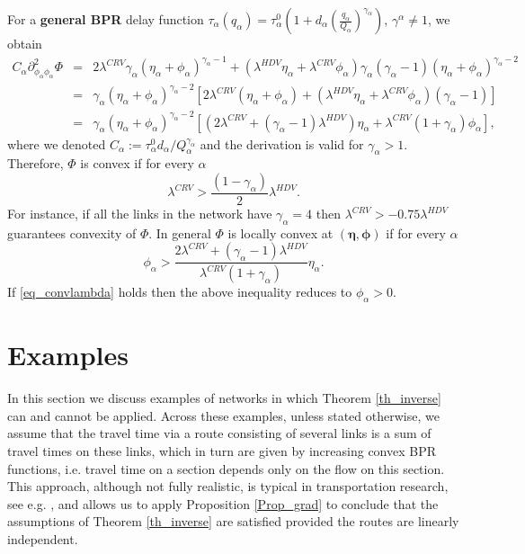 \documentclass[a4paper,11pt]{article}
\begin{document}
For a {\bf general BPR} delay function 
$\tau_\alpha (q_\alpha) = \tau^0_\alpha \left(1 + d_\alpha \left(\frac {q_\alpha}{Q_\alpha}\right) ^{\gamma_\alpha} \right)$, $\gamma^\alpha \neq 1$, we obtain
\begin{eqnarray*}
C_\alpha \partial^2 _{\phi_\alpha \phi_\alpha} \Phi &=& 2\lambda^{CRV}  \gamma_\alpha (\eta_\alpha + \phi_\alpha)^{\gamma_\alpha - 1} + (\lambda^{HDV}\eta_\alpha + \lambda^{CRV} \phi_\alpha) \gamma_\alpha (\gamma_\alpha-1)(\eta_\alpha + \phi_\alpha)^{\gamma_\alpha -2} \\
&=& \gamma_\alpha (\eta_\alpha + \phi_\alpha)^{\gamma_\alpha -2} \left[  2\lambda^{CRV} (\eta_\alpha + \phi_\alpha) + (\lambda^{HDV}\eta_\alpha + \lambda^{CRV} \phi_\alpha) (\gamma_\alpha-1)\right]  \\
&=& \gamma_\alpha (\eta_\alpha + \phi_\alpha)^{\gamma_\alpha -2} \left[  \left(2\lambda^{CRV}+(\gamma_\alpha-1)\lambda^{HDV}\right)\eta_\alpha + \lambda^{CRV}\left(1 + \gamma_\alpha\right)\phi_\alpha  \right],
\end{eqnarray*}
where we denoted $C_\alpha := \tau_\alpha ^0 d_\alpha / Q^{\gamma_\alpha}_\alpha$ and the derivation is valid for $\gamma_{\alpha} > 1$. 
Therefore, $\Phi$ is convex if for every $\alpha$
\begin{equation}
\label{eq_convlambda}
\lambda^{CRV} > \frac {(1-\gamma_\alpha)}{2} \lambda^{HDV}.
\end{equation}
For instance, if all the links in the network have $\gamma_\alpha = 4$ then $\lambda^{CRV} > -0.75 \lambda^{HDV}$ guarantees convexity of $\Phi$. 
In general $\Phi$ is locally convex at $(\boldsymbol{\eta},\boldsymbol{\phi})$ if for every $\alpha$
\begin{equation*}
\phi_\alpha > \frac{2\lambda^{CRV}+(\gamma_\alpha-1)\lambda^{HDV}}{\lambda^{CRV}\left(1 + \gamma_\alpha\right)}   \eta_\alpha.
\end{equation*}
If \eqref{eq_convlambda} holds then the above inequality reduces to $\phi_\alpha > 0$. 

\section{Examples}
\label{Sec_Examples}
In this section we discuss examples of networks in which Theorem \ref{th_inverse} can and cannot be applied.
Across these examples, unless stated otherwise, we assume that the travel time via a route consisting of several links is a sum of travel times on these links, which in turn are given by increasing convex BPR functions, i.e. travel time on a section depends only on the flow on this section. This approach, although not fully realistic, is typical in transportation research, see e.g. \cite{Stabler}, and allows us to apply Proposition \ref{Prop_grad} to conclude that the assumptions of Theorem \ref{th_inverse} are satisfied provided the routes are linearly independent. 
\end{document}
